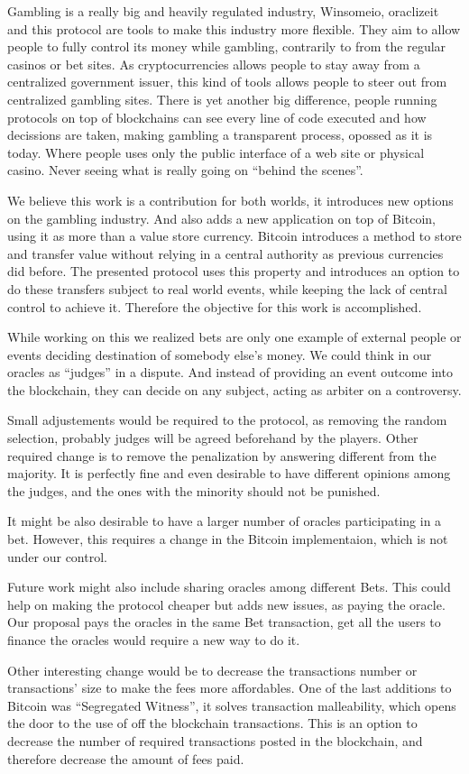Gambling is a really big and heavily regulated industry, Winsomeio, oraclizeit
  and this protocol are tools to make this industry more flexible.
They aim to allow people to fully control its money while gambling, contrarily
  to from the regular casinos or bet sites.
As cryptocurrencies allows people to stay away from a centralized government
  issuer, this kind of tools allows people to steer out from centralized
  gambling sites.
There is yet another big difference, people running protocols on top of
  blockchains can see every line of code executed and how decissions are taken,
  making gambling a transparent process, opossed as it is today.
Where people uses only the public interface of a web site or physical casino.
Never seeing what is really going on ``behind the scenes''.

We believe this work is a contribution for both worlds, it introduces new
  options on the gambling industry.
And also adds a new application on top of Bitcoin, using it as more than a
  value store currency.
Bitcoin introduces a method to store and transfer value without relying in a
  central authority as previous currencies did before.
The presented protocol uses this property and introduces an option to do
  these transfers subject to real world events, while keeping the lack
  of central control to achieve it.
Therefore the objective for this work is accomplished.

While working on this we realized bets are only one example of external
  people or events deciding destination of somebody else's money.
We could think in our oracles as ``judges'' in a dispute.
And instead of providing an event outcome into the blockchain, they can
  decide on any subject, acting as arbiter on a controversy.

Small adjustements would be required to the protocol, as removing the random
  selection, probably judges will be agreed beforehand by the players.
Other required change is to remove the penalization by answering different
  from the majority.
It is perfectly fine and even desirable to have different opinions among the
  judges, and the ones with the minority should not be punished.

It might be also desirable to have a larger number of oracles participating in
  a bet.
However, this requires a change in the Bitcoin implementaion, which is not
  under our control.

Future work might also include sharing oracles among different Bets.
This could help on making the protocol cheaper but adds new issues, as paying
  the oracle.
Our proposal pays the oracles in the same Bet transaction, get all the users to
  finance the oracles would require a new way to do it.

Other interesting change would be to decrease the transactions number or
  transactions' size to make the fees more affordables.
One of the last additions to Bitcoin was ``Segregated Witness'', it solves
  transaction malleability, which opens the door to the use of off the blockchain
  transactions.
This is an option to decrease the number of required transactions posted in the
  blockchain, and therefore decrease the amount of fees paid.
